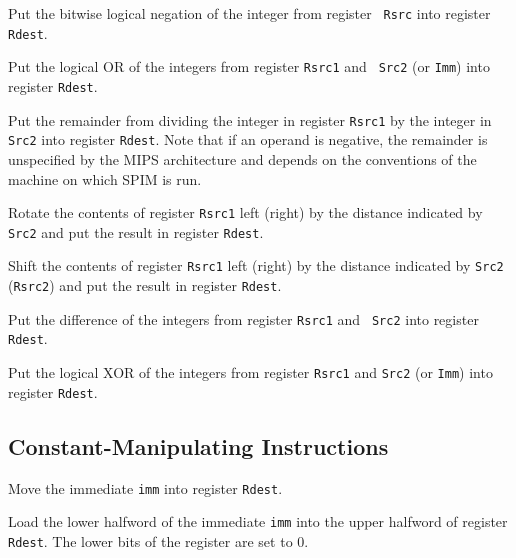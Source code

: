 Put the bitwise logical negation of the integer from register {\tt
Rsrc} into register {\tt Rdest}.

Put the logical OR of the integers from register {\tt Rsrc1} and {\tt
Src2} (or {\tt Imm}) into register {\tt Rdest}.

Put the remainder from dividing the integer in register {\tt Rsrc1} by
the integer in {\tt Src2} into register {\tt Rdest}.  Note that if an
operand is negative, the remainder is unspecified by the MIPS
architecture and depends on the conventions of the machine on which
SPIM is run.

Rotate the contents of register {\tt Rsrc1} left (right) by the
distance indicated by {\tt Src2} and put the result in register
{\tt Rdest}.

Shift the contents of register {\tt Rsrc1} left (right) by the
distance indicated by {\tt Src2} ({\tt Rsrc2}) and put the
result in register {\tt Rdest}.

Put the difference of the integers from register {\tt Rsrc1} and {\tt
Src2} into register {\tt Rdest}.

Put the logical XOR of the integers from register {\tt Rsrc1} and
{\tt Src2} (or {\tt Imm}) into register {\tt Rdest}.


\subsection {Constant-Manipulating Instructions}

Move the immediate {\tt imm} into register {\tt Rdest}.

Load the lower halfword of the immediate {\tt imm} into the upper
halfword of register {\tt Rdest}.  The lower bits of the register are
set to 0.



